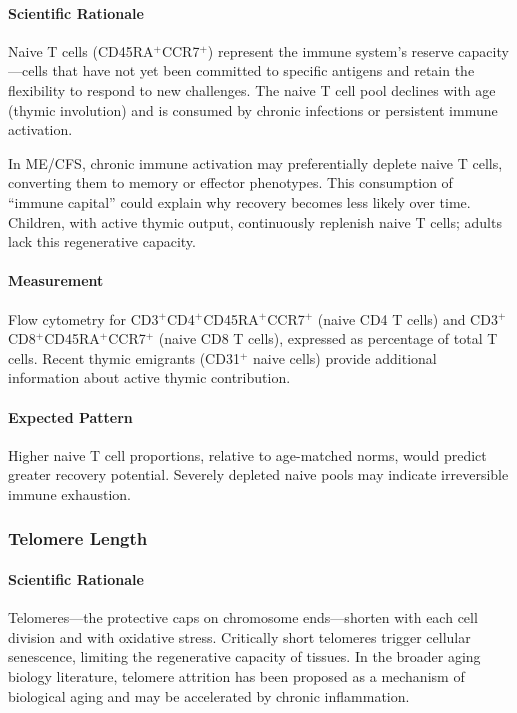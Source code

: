 \paragraph{Scientific Rationale}
Naive T cells (CD45RA$^+$CCR7$^+$) represent the immune system's reserve capacity---cells that have not yet been committed to specific antigens and retain the flexibility to respond to new challenges. The naive T cell pool declines with age (thymic involution) and is consumed by chronic infections or persistent immune activation.

In ME/CFS, chronic immune activation may preferentially deplete naive T cells, converting them to memory or effector phenotypes. This consumption of ``immune capital'' could explain why recovery becomes less likely over time. Children, with active thymic output, continuously replenish naive T cells; adults lack this regenerative capacity.

\paragraph{Measurement}
Flow cytometry for CD3$^+$CD4$^+$CD45RA$^+$CCR7$^+$ (naive CD4 T cells) and CD3$^+$CD8$^+$CD45RA$^+$CCR7$^+$ (naive CD8 T cells), expressed as percentage of total T cells. Recent thymic emigrants (CD31$^+$ naive cells) provide additional information about active thymic contribution.

\paragraph{Expected Pattern}
Higher naive T cell proportions, relative to age-matched norms, would predict greater recovery potential. Severely depleted naive pools may indicate irreversible immune exhaustion.

\subsubsection{Telomere Length}

\paragraph{Scientific Rationale}
Telomeres---the protective caps on chromosome ends---shorten with each cell division and with oxidative stress. Critically short telomeres trigger cellular senescence, limiting the regenerative capacity of tissues. In the broader aging biology literature, telomere attrition has been proposed as a mechanism of biological aging and may be accelerated by chronic inflammation.

